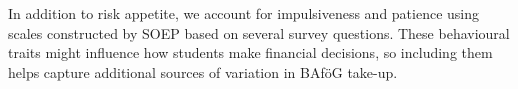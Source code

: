 In addition to risk appetite, we account for impulsiveness and patience using scales constructed by SOEP based on several survey questions. These behavioural traits might influence how students make financial decisions, so including them helps capture additional sources of variation in BAföG take-up.




